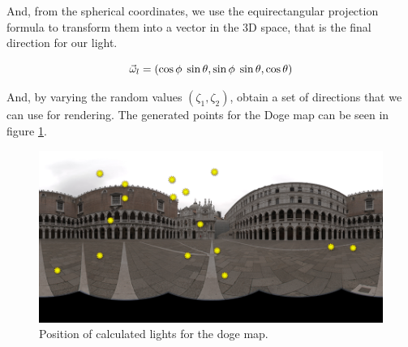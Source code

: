 And, from the spherical coordinates, we use the equirectangular projection formula to transform them into a vector in the 3D space, that is the final direction for our light.

$$
\vec{\omega}_l = (\cos\phi\;\sin\theta, \sin\phi\;\sin\theta, \cos\theta)
$$

And, by varying the random values $(\zeta_1,\zeta_2)$, obtain a set of directions that we can use for rendering. The generated points for the Doge map can be seen in figure \ref{fig:doge_lights}.


\begin{figure}
\centering
\includegraphics[width=\textwidth]{images/matlab/doge2_lights.png}
\caption{Position of calculated lights for the doge map.}
\label{fig:doge_lights}
\end{figure}